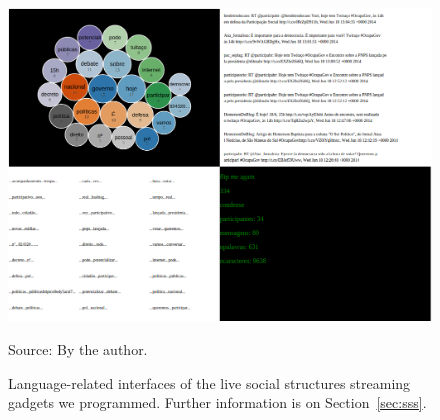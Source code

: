 \begin{apendicesenv}
\begin{figure}[H]
  \centering
    \includegraphics[width=.85\textwidth]{figs/telao2.png}
  \caption{Language-related interfaces of the live social structures streaming gadgets we programmed.
	Further information is on Section~\ref{sec:sss}.}\label{fig:telao2}
\begin{flushleft}\footnotesize
Source: By the author.\
\end{flushleft}
\end{figure}


\end{apendicesenv}
